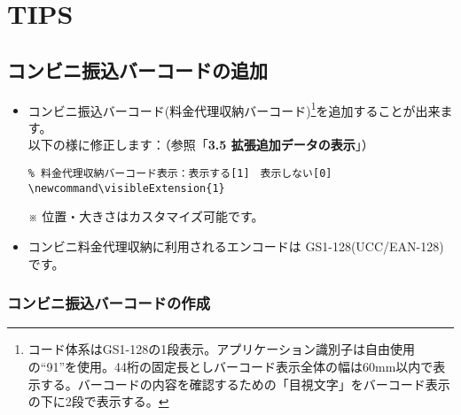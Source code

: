 \documentclass[a4paper,10pt,titlepage]{ltjsarticle}
\def\colH#1{\color[HTML]{#1}}
\newcommand\visibleExtension{0}
\begin{document}
\newpage

\section{TIPS}

\subsection{コンビニ振込バーコードの追加}

\begin{itemize}
  \item {\colH{800000} コンビニ振込バーコード}(料金代理収納バーコード)\footnote{コード体系はGS1-128の1段表示。アプリケーション識別子は自由使用の“91”を使用。44桁の固定長としバーコード表示全体の幅は60mm以内で表示する。バーコードの内容を確認するための「目視文字」をバーコード表示の下に2段で表示する。}を追加することが出来ます。\\
以下の様に修正します：（参照「{\bfseries 3.5 拡張追加データの表示}」）
\begin{verbatim}
% 料金代理収納バーコード表示：表示する[1]　表示しない[0]
\newcommand\visibleExtension{1}
\end{verbatim}
  \item[\hspace{30pt}※] 位置・大きさはカスタマイズ可能です。 
  \item コンビニ料金代理収納に利用されるエンコードは{\colH{800000} GS1-128}(UCC/EAN-128)です。
\end{itemize}

\subsubsection{コンビニ振込バーコードの作成}
\end{document}
